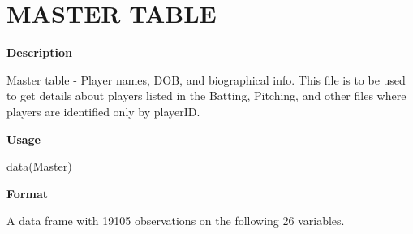 \documentclass[]{book}
\theoremstyle{definition}
\theoremstyle{definition}
\theoremstyle{definition}
\theoremstyle{remark}
\begin{document}
\hypertarget{master-table}{%
\section{\texorpdfstring{\textbf{MASTER
TABLE}}{MASTER TABLE}}\label{master-table}}

\textbf{Description}

Master table - Player names, DOB, and biographical info. This file is to
be used to get details about players listed in the Batting, Pitching,
and other files where players are identified only by playerID.

\textbf{Usage}

data(Master)

\textbf{Format}

A data frame with 19105 observations on the following 26 variables.
\end{document}
